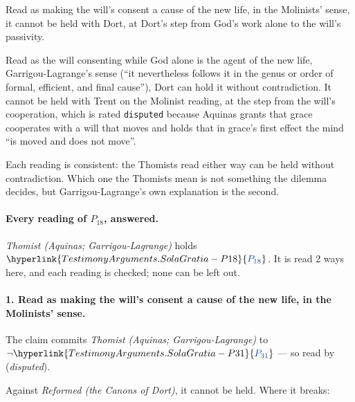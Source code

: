 \documentclass[11pt]{article}
\newcommand{\pvar}[2]{\hyperlink{#1-P#2}{\textcolor{claimlink}{P_{#2}}}}
\begin{document}
Read as making the will’s consent a cause of the new life, in the Molinists’ sense, it cannot be held with Dort, at Dort’s step from God’s work alone to the will’s passivity.

Read as the will consenting while God alone is the agent of the new life, Garrigou-Lagrange’s sense (“it nevertheless follows it in the genus or order of formal, efficient, and final cause”), Dort can hold it without contradiction. It cannot be held with Trent on the Molinist reading, at the step from the will’s cooperation, which is rated \texttt{disputed} because Aquinas grants that grace cooperates with a will that moves and holds that in grace’s first effect the mind “is moved and does not move”.

Each reading is consistent: the Thomists read either way can be held without contradiction. Which one the Thomists mean is not something the dilemma decides, but Garrigou-Lagrange’s own explanation is the second.

\paragraph{Every reading of \(P_{18}\), answered.} \emph{Thomist (Aquinas; Garrigou-Lagrange)} holds \(\pvar{TestimonyArguments.SolaGratia}{18}\). It is read 2 ways here, and each reading is checked; none can be left out.

\paragraph{1. Read as making the will’s consent a cause of the new life, in the Molinists’ sense.} The claim commits \emph{Thomist (Aquinas; Garrigou-Lagrange)} to \(\lnot \pvar{TestimonyArguments.SolaGratia}{31}\) --- so read by \cite{pohle-molinism-1911} (\emph{disputed}).

Against \emph{Reformed (the Canons of Dort)}, it cannot be held. Where it breaks:
\end{document}
